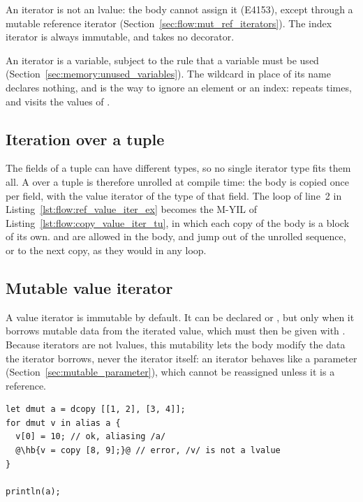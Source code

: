 An iterator is not an lvalue: the body cannot assign it (E4153), except through
a mutable reference iterator (Section~\ref{sec:flow:mut_ref_iterators}). The
index iterator is always immutable, and takes no decorator.

An iterator is a variable, subject to the rule that a variable must be used
(Section~\ref{sec:memory:unused_variables}). The wildcard \token{\_} in place of
its name declares nothing, and is the way to ignore an element or an index:
 repeats  times, and 
visits the values of .

\subsection{Iteration over a tuple}

The fields of a tuple can have different types, so no single iterator type fits
them all. A  over a tuple is therefore unrolled at compile time: the
body is copied once per field, with the value iterator of the type of that field.
The loop of line~2 in Listing~\ref{lst:flow:ref_value_iter_ex} becomes the
M-YIL of Listing~\ref{lst:flow:copy_value_iter_tu}, in which each copy of the
body is a block of its own.  and  are allowed in
the body, and jump out of the unrolled sequence, or to the next copy, as they
would in any loop.

\subsection{Mutable value iterator}
\label{sec:flow:mut_value_iterators}

A value iterator is immutable by default. It can be declared  or
, but only when it borrows mutable data from the iterated value,
which must then be given with . Because iterators are not lvalues,
this mutability lets the body modify the data the iterator borrows, never the
iterator itself: an iterator behaves like a parameter
(Section~\ref{sec:mutable_parameter}), which cannot be reassigned unless it is a
reference.

\begin{lstlisting}[style=coloredverbatimError, escapechar=@]
let dmut a = dcopy [[1, 2], [3, 4]];
for dmut v in alias a {
  v[0] = 10; // ok, aliasing /a/
  @\hb{v = copy [8, 9];}@ // error, /v/ is not a lvalue
}

println(a);
\end{lstlisting}

